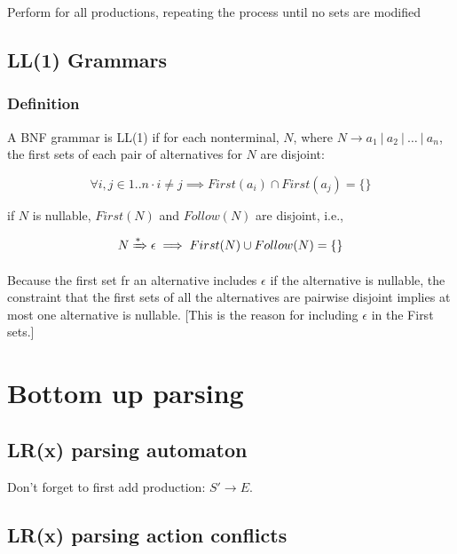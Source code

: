 \documentclass[fontsize=10pt,a4paper]{article}
\begin{document}
\begin{multicols}{3}
    Perform for all productions, repeating the process until no sets are modified



    \subsection{LL(1) Grammars}

    \subsubsection{Definition}

    A BNF grammar is LL(1) if for each nonterminal, $N$, where $N \rightarrow a_1 ~\vert~ a_2 ~\vert~ \dots ~\vert~ a_n$,\\

    the first sets of each pair of alternatives for $N$ are disjoint:

        \[\forall i, j \in 1..n \cdot i \neq j \implies First(a_i) \cap First(a_j) = \{\}\]

    if $N$ is nullable, $First(N)$ and $Follow(N)$ are disjoint, i.e.,

    \[N \xRightarrow{*} \epsilon \implies First(N) \cup Follow(N) = \{\}\]

    Because the first set fr an alternative includes $\epsilon$ if the alternative is nullable, the constraint that the first sets of all the alternatives are pairwise disjoint implies at most one alternative is nullable. [This is the reason for including $\epsilon$ in the First sets.]
    

    \section{Bottom up parsing}

    \subsection{LR(x) parsing automaton}

    Don't forget to first add production: $S' \rightarrow E$.

    \subsection{LR(x) parsing action conflicts}


\end{multicols}
\end{document}
